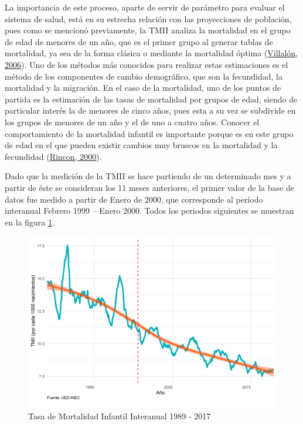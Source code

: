\documentclass[
]{article}
\begin{document}
La importancia de este proceso, aparte de servir de parámetro para
evaluar el sistema de salud, está en su estrecha relación con las
proyecciones de población, pues como se mencionó previamente, la TMII
analiza la mortalidad en el grupo de edad de menores de un año, que es
el primer grupo al generar tablas de mortalidad, ya sea de la forma
clásica o mediante la mortalidad óptima
(\protect\hyperlink{ref-mortalidad_optima}{Villalón, 2006}). Uno de los
métodos más conocidos para realizar estas estimaciones es el método de
los componentes de cambio demográfico, que son la fecundidad, la
mortalidad y la migración. En el caso de la mortalidad, uno de los
puntos de partida es la estimación de las tasas de mortalidad por grupos
de edad, siendo de particular interés la de menores de cinco años, pues
esta a su vez se subdivide en los grupos de menores de un año y el de
uno a cuatro años. Conocer el comportamiento de la mortalidad infantil
es importante porque es en este grupo de edad en el que pueden existir
cambios muy bruscos en la mortalidad y la fecundidad
(\protect\hyperlink{ref-Rincon}{Rincon, 2000}).

Dado que la medición de la TMII se hace partiendo de un determinado mes
y a partir de éste se consideran los 11 meses anteriores, el primer
valor de la base de datos fue medido a partir de Enero de 2000, que
corresponde al período interanual Febrero 1999 -- Enero 2000. Todos los
periodos siguientes se muestran en la figura \ref{fig:tmiiplotgeneral}.

\begin{figure}[!h]
\includegraphics[width=1\linewidth,height=1\textheight]{Tesis_files/figure-latex/tmiiplotgeneral-1} \caption{Tasa de Mortalidad Infantil Interanual 1989 - 2017}\label{fig:tmiiplotgeneral}
\end{figure}
\end{document}
